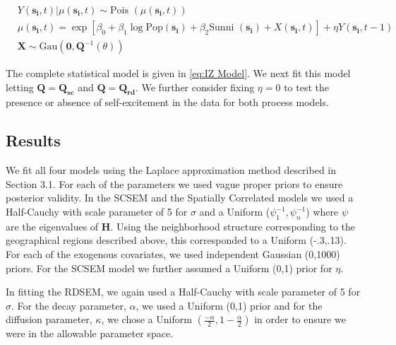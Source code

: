 \documentclass[11pt]{isuthesis}
\begin{document}
\begin{align}
& Y(\boldsymbol{s_i},t)|\mu(\boldsymbol{s_i},t) \sim \text{Pois }(\mu(\boldsymbol{s_i},t)) \label{eq:IZ Model}\\
& \mu(\boldsymbol{s_i},t) = \exp[\beta_0+\beta_1\log \text{Pop}(\boldsymbol{s_i})+\beta_2\text{Sunni }(\boldsymbol{s_i})+X(\boldsymbol{s_i},t)] + \eta Y(\boldsymbol{s_i},t-1) \nonumber \\
& \boldsymbol{X}\sim \mbox{Gau}(\boldsymbol{0},\boldsymbol{Q}^{-1}(\theta))  \nonumber
\end{align}

The complete statistical model is given in \eqref{eq:IZ Model}.  We next fit this model letting $\boldsymbol{Q}=\boldsymbol{Q_{sc}}$ and $\boldsymbol{Q}=\boldsymbol{Q_{rd}}$.  We further consider fixing $\eta=0$ to test the presence or absence of self-excitement in the data for both process models.


\subsection{Results}



We fit all four models using the Laplace approximation method described in Section 3.1.  For each of the parameters we used vague proper priors to ensure posterior validity.  In the SCSEM and the Spatially Correlated models we used a Half-Cauchy with scale parameter of 5 for $\sigma$ and a Uniform ($\psi_{1}^{-1},\psi_{n}^{-1}$) where $\psi$ are the eigenvalues of $\boldsymbol{H}$.  Using the neighborhood structure corresponding to the geographical regions described above, this corresponded to a Uniform (-.3,.13). For each of the exogenous covariates, we used independent Gaussian (0,1000) priors.  For the SCSEM model we further assumed a Uniform (0,1) prior for $\eta$.

In fitting the RDSEM, we again used a Half-Cauchy with scale parameter of 5 for $\sigma$.  For the decay parameter, $\alpha$, we used a Uniform (0,1) prior and for the diffusion parameter, $\kappa$, we chose a Uniform $\left(\frac{-\alpha}{2},1-\frac{\alpha}{2}\right)$ in order to ensure we were in the allowable parameter space.
\end{document}
